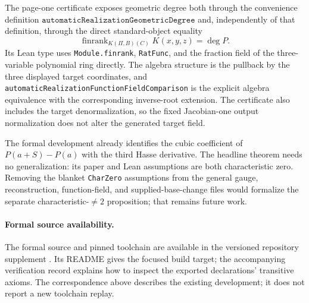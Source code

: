 The page-one certificate exposes geometric degree both through the
convenience definition
\(\texttt{automaticRealizationGeometricDegree}\) and, independently of that
definition, through the direct standard-object equality
\[
 \operatorname{finrank}_{K(\Pi,B)(C)}K(x,y,z)
 =\deg P.
\]
Its Lean type uses \texttt{Module.finrank}, \texttt{RatFunc}, and the fraction
field of the three-variable polynomial ring directly.  The algebra structure
is the pullback by the three displayed target coordinates, and
\nolinkurl{automaticRealizationFunctionFieldComparison} is the explicit
algebra equivalence with the corresponding inverse-root extension.
The certificate also includes the target denormalization, so the fixed
Jacobian-one output normalization does not alter the generated target field.

The formal development already identifies the cubic coefficient of
\(P(a+S)-P(a)\) with the third Hasse derivative.  The headline theorem needs
no generalization: its paper and Lean assumptions are both characteristic
zero.  Removing the blanket \texttt{CharZero} assumptions from the general
gauge, reconstruction, function-field, and supplied-base-change files would
formalize the separate characteristic-\(\ne2\) proposition; that remains
future work.

\paragraph{Formal source availability.}
The formal source and pinned toolchain are available in the versioned
repository supplement \cite{FormalSupplement}. Its README gives the focused
build target; the accompanying verification record explains how to inspect
the exported declarations' transitive axioms. The correspondence above
describes the existing development; it does not report a new toolchain replay.
